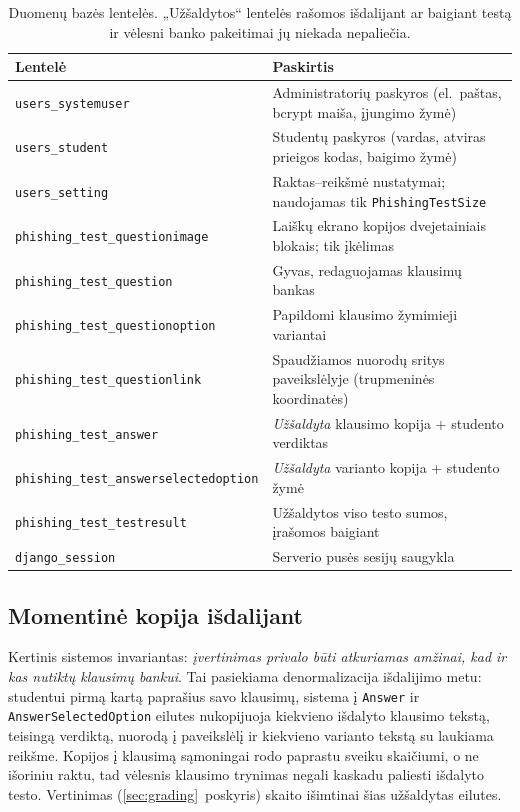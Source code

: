 \documentclass[11pt,a4paper]{article}
\newcommand{\code}[1]{\texttt{#1}}
\begin{document}
\begin{table}[h]
\centering
\small
\begin{tabular}{@{}ll@{}}
\toprule
\textbf{Lentelė} & \textbf{Paskirtis} \\
\midrule
\code{users\_systemuser}    & Administratorių paskyros (el.~paštas, bcrypt maiša, įjungimo žymė) \\
\code{users\_student}       & Studentų paskyros (vardas, atviras prieigos kodas, baigimo žymė) \\
\code{users\_setting}       & Raktas--reikšmė nustatymai; naudojamas tik \code{PhishingTestSize} \\
\code{phishing\_test\_questionimage} & Laiškų ekrano kopijos dvejetainiais blokais; tik įkėlimas \\
\code{phishing\_test\_question}      & Gyvas, redaguojamas klausimų bankas \\
\code{phishing\_test\_questionoption} & Papildomi klausimo žymimieji variantai \\
\code{phishing\_test\_questionlink}   & Spaudžiamos nuorodų sritys paveikslėlyje (trupmeninės koordinatės) \\
\code{phishing\_test\_answer}         & \emph{Užšaldyta} klausimo kopija + studento verdiktas \\
\code{phishing\_test\_answerselectedoption} & \emph{Užšaldyta} varianto kopija + studento žymė \\
\code{phishing\_test\_testresult}     & Užšaldytos viso testo sumos, įrašomos baigiant \\
\code{django\_session}      & Serverio pusės sesijų saugykla \\
\bottomrule
\end{tabular}
\caption{Duomenų bazės lentelės. „Užšaldytos`` lentelės rašomos
išdalijant ar baigiant testą ir vėlesni banko pakeitimai jų niekada
nepaliečia.}
\label{tab:tables}
\end{table}

\subsection{Momentinė kopija išdalijant}
\label{sec:snapshot}

Kertinis sistemos invariantas: \emph{įvertinimas privalo būti
atkuriamas amžinai, kad ir kas nutiktų klausimų bankui}. Tai
pasiekiama denormalizacija išdalijimo metu: studentui pirmą kartą
paprašius savo klausimų, sistema į \code{Answer} ir
\code{AnswerSelectedOption} eilutes nukopijuoja kiekvieno išdalyto
klausimo tekstą, teisingą verdiktą, nuorodą į paveikslėlį ir kiekvieno
varianto tekstą su laukiama reikšme. Kopijos į klausimą sąmoningai
rodo paprastu sveiku skaičiumi, o ne išoriniu raktu, tad vėlesnis
klausimo trynimas negali kaskadu paliesti išdalyto testo. Vertinimas
(\ref{sec:grading}~poskyris) skaito išimtinai šias užšaldytas
eilutes.
\end{document}
